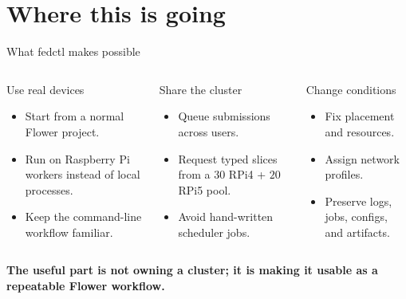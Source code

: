 \documentclass[aspectratio=169,xcolor=dvipsnames]{beamer}
\newcommand{\tightitems}{\setlength\itemsep{0.45em}}
\begin{document}
\section{Where this is going}

\begin{frame}{What fedctl makes possible}
    \begin{columns}[T,totalwidth=\textwidth]
        \begin{block}{Use real devices}
            \begin{itemize}
                \tightitems
                \item Start from a normal Flower project.
                \item Run on Raspberry Pi workers instead of local processes.
                \item Keep the command-line workflow familiar.
            \end{itemize}
        \end{block}

        \begin{exampleblock}{Share the cluster}
            \begin{itemize}
                \tightitems
                \item Queue submissions across users.
                \item Request typed slices from a \(30\) RPi4 + \(20\) RPi5 pool.
                \item Avoid hand-written scheduler jobs.
            \end{itemize}
        \end{exampleblock}

        \begin{alertblock}{Change conditions}
            \begin{itemize}
                \tightitems
                \item Fix placement and resources.
                \item Assign network profiles.
                \item Preserve logs, jobs, configs, and artifacts.
            \end{itemize}
        \end{alertblock}
    \end{columns}

    \vspace{0.8em}
    \centering
    \textbf{The useful part is not owning a cluster; it is making it usable as a repeatable Flower workflow.}
\end{frame}
\end{document}
